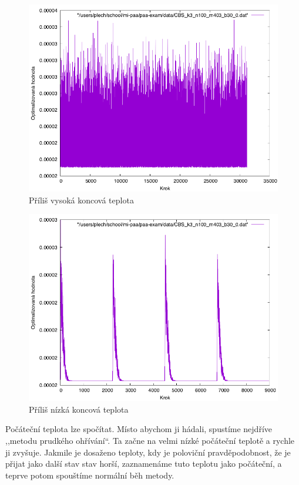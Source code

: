 \documentclass[12pt,a4paper]{article}
\begin{document}
\begin{figure}[H]
\includegraphics[width=\textwidth]{tooHighEnd}
\caption{Příliš vysoká koncová teplota}
\label{tooHighEnd}
\end{figure}

\begin{figure}[H]
\includegraphics[width=\textwidth]{tooLowEnd}
\caption{Příliš nízká koncová teplota}
\label{tooLowEnd}
\end{figure}



Počáteční teplota lze spočítat. Místo abychom ji hádali, spustíme nejdříve ,,metodu prudkého ohřívání``. Ta začne na velmi nízké počáteční teplotě a rychle ji zvyšuje. Jakmile je dosaženo teploty, kdy je poloviční pravděpodobnost, že je přijat jako další stav stav horší, zaznamenáme tuto teplotu jako počáteční, a teprve potom spouštíme normální běh metody.
\end{document}
